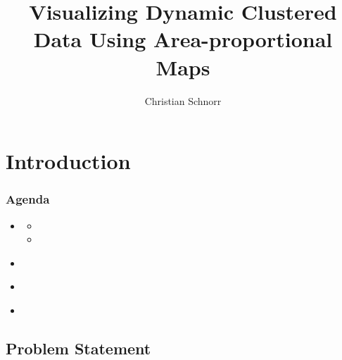 \documentclass[t,18pt]{beamer}
\newcommand{\light}[1]{\textcolor{black!40}{#1}}
\begin{document}
\title{Visualizing Dynamic Clustered Data Using Area-proportional Maps}
\author{Christian Schnorr}

\begin{frame}
  \titlepage
\end{frame}





\section{Introduction}
\label{sect:introduction}

\begin{frame}
  \frametitle{Agenda}
  \begin{itemize}
    \item {} \begin{itemize}
      \item {}
      \item {}
    \end{itemize}
    \item \light{}
    \item \light{}
    \item \light{}
  \end{itemize}
\end{frame}

\subsection{Problem Statement}
\label{subsect:problem-statement}
\end{document}
